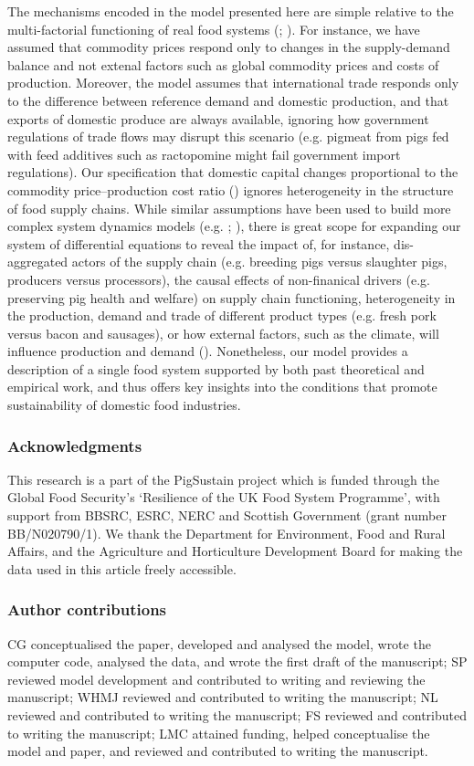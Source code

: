 \documentclass[12pt]{article}
\begin{document}
The mechanisms encoded in the model presented here are simple relative to the multi-factorial functioning of real food systems (\cite{ericksen2008}; \cite{ingram2011}). For instance, we have assumed that commodity prices respond only to changes in the supply-demand balance and not extenal factors such as global commodity prices and costs of production. Moreover, the model assumes that international trade responds only to the difference between reference demand and domestic production, and that exports of domestic produce are always available, ignoring how government regulations of trade flows may disrupt this scenario (e.g. pigmeat from pigs fed with feed additives such as ractopomine might fail government import regulations). Our specification that domestic capital changes proportional to the commodity price--production cost ratio (\cite{sterman2000}) ignores heterogeneity in the structure of food supply chains. While similar assumptions have been used to build more complex system dynamics models (e.g. \cite{meadows1971}; \cite{sterman2000}), there is great scope for expanding our system of differential equations to reveal the impact of, for instance, dis-aggregated actors of the supply chain (e.g. breeding pigs versus slaughter pigs, producers versus processors), the causal effects of non-finanical drivers (e.g. preserving pig health and welfare) on supply chain functioning, heterogeneity in the production, demand and trade of different product types (e.g. fresh pork versus bacon and sausages), or how external factors, such as the climate, will influence production and demand (\cite{vermeulen2012}). Nonetheless, our model provides a description of a single food system supported by both past theoretical and empirical work, and thus offers key insights into the conditions that promote sustainability of domestic food industries.

\subsubsection*{Acknowledgments}
This research is a part of the PigSustain project which is funded through the Global Food Security's ‘Resilience of the UK Food System Programme’, with support from BBSRC, ESRC, NERC and Scottish Government (grant number BB/N020790/1). We thank the Department for Environment, Food and Rural Affairs, and the Agriculture and Horticulture Development Board for making the data used in this article freely accessible.

\subsubsection*{Author contributions}
CG conceptualised the paper, developed and analysed the model, wrote the computer code, analysed the data, and wrote the first draft of the manuscript; SP reviewed model development and contributed to writing and reviewing the manuscript; WHMJ reviewed and contributed to writing the manuscript; NL reviewed and contributed to writing the manuscript; FS reviewed and contributed to writing the manuscript; LMC attained funding, helped conceptualise the model and paper, and reviewed and contributed to writing the manuscript.
\end{document}

